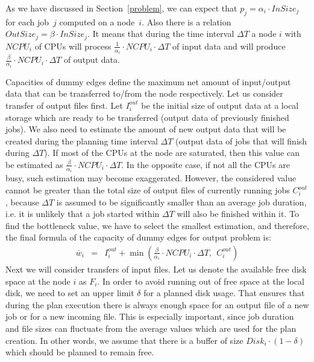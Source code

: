 \documentclass{svjour3}                     %
\begin{document}
As we have discussed in Section~\ref{problem}, we can expect that $p_{j} =
\alpha_{i} \cdot InSize_{j}$  for each job~$j$ computed on a node~$i$. Also
there is a relation $OutSize_{j} = \beta \cdot InSize_{j}$.
It means that during the time interval $\Delta T$ a
node $i$ with $NCPU_{i}$  of CPUs  will process $\frac{1}{\alpha_{i}} \cdot
NCPU_{i} \cdot \Delta T$ of input data and will produce
$\frac{\beta}{\alpha_{i}} \cdot NCPU_{i} \cdot \Delta T$ of output data.

Capacities of dummy edges define the maximum net amount of input/output data that can be transferred to/from the node respectively. Let us consider transfer of output files first. Let $I_{i}^{out}$ be the initial size of output data at a local storage which are ready to be transferred (output data of previously finished jobs). We also need to estimate the amount of new output data that will be created during the planning time interval $\Delta T$ (output data of jobs that will finish during $\Delta T$). If most of the CPUs at the node are saturated, then this value can be estimated as $\frac{\beta}{\alpha_{i}} \cdot NCPU_{i} \cdot \Delta T$. In the opposite case, if not all the CPUs are busy, such estimation may become exaggerated. However, the considered value cannot be greater than the total size of output files of currently running jobs $C_{i}^{out}$, because $\Delta T$ is assumed to be significantly smaller than an average job duration, i.e. it is unlikely that a job started within $\Delta T$ will also be finished within it. To find the bottleneck value, we have to select the smallest estimation, and therefore, the final formula of the capacity of dummy edges for output problem is:
\begin{eqnarray}
\overline{w}_{i} &=& I_{i}^{out} + \min(\frac{\beta}{\alpha_{i}} \cdot NCPU_{i} \cdot \Delta T,\ \  C_{i}^{out}) \label{sigma}
\end{eqnarray}  
Next we will consider transfers of input files. Let us denote the available free disk space at the node $i$ as $F_{i}$. In order to avoid running out of free space at the local disk, we need to set an upper limit $\delta$ for a planned disk usage. That ensures that during the plan execution there is always enough space for an output file of a new job or for a new incoming file. This is especially important, since job duration and file sizes can fluctuate from the average values which are used for the plan creation. In other words, we assume that there is a buffer of size $Disk_{i} \cdot (1 - \delta)$ which should be planned to remain free.
\end{document}
